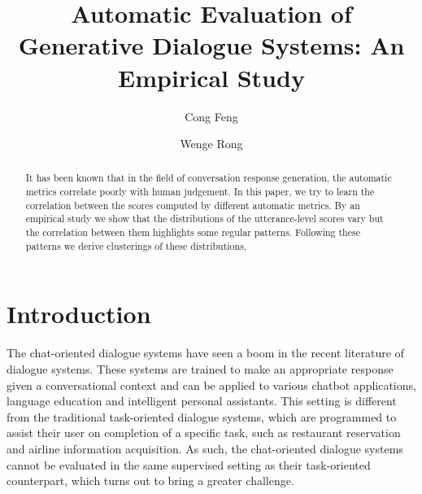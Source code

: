 \documentclass[runningheads]{llncs}
\begin{document}
    \title{Automatic Evaluation of Generative Dialogue Systems: An Empirical Study}


    \author{Cong Feng \and Wenge Rong}



    \maketitle

    \begin{abstract}
        It has been known that in the field of conversation response generation, the automatic metrics correlate poorly with human judgement.
        In this paper, we try to learn the correlation between the scores computed by different automatic metrics.
        By an empirical study we show that the distributions of the utterance-level scores vary but the correlation between them highlights some regular patterns.
        Following these patterns we derive clusterings of these distributions,
    \end{abstract}


    \section{Introduction}
    The chat-oriented dialogue systems have seen a boom in the recent literature of dialogue systems. These systems are trained to make an appropriate response given a conversational context and can be applied to various chatbot applications, language education and intelligent personal assistants. This setting is different from the traditional task-oriented dialogue systems, which are programmed to assist their user on completion of a specific task, such as restaurant reservation and airline information acquisition. As such, the chat-oriented dialogue systems cannot be evaluated in the same supervised setting as their task-oriented counterpart, which turns out to bring a greater challenge.
\end{document}
